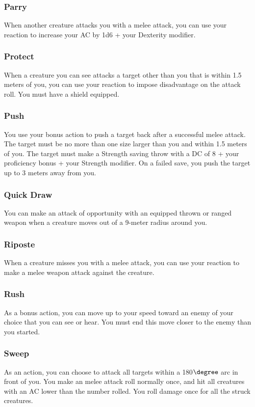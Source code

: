 \subsubsection{Parry} \label{tec::parry}
When another creature attacks you with a melee attack, you can use your reaction to increase your AC by 1d6 + your Dexterity modifier.

\subsubsection{Protect} \label{tec::protect}
When a creature you can see attacks a target other than you that is within 1.5 meters of you, you can use your reaction to impose disadvantage on the attack roll.
You must have a shield equipped.

\subsubsection{Push} \label{tec::push}
You use your bonus action to push a target back after a successful melee attack.
The target must be no more than one size larger than you and within 1.5 meters of you.
The target must make a Strength saving throw with a DC of 8 + your proficiency bonus + your Strength modifier.
On a failed save, you push the target up to 3 meters away from you.

\subsubsection{Quick Draw} \label{tec::quickdraw}
You can make an attack of opportunity with an equipped thrown or ranged weapon when a creature moves out of a 9-meter radius around you.

\subsubsection{Riposte} \label{tec::riposte}
When a creature misses you with a melee attack, you can use your reaction to make a melee weapon attack against the creature.

\subsubsection{Rush} \label{tec::rush}
As a bonus action, you can move up to your speed toward an enemy of your choice that you can see or hear.
You must end this move closer to the enemy than you started.

\subsubsection{Sweep} \label{tec::sweep}
As an action, you can choose to attack all targets within a 180$\degree$ arc in front of you.
You make an melee attack roll normally once, and hit all creatures with an AC lower than the number rolled.
You roll damage once for all the struck creatures.

